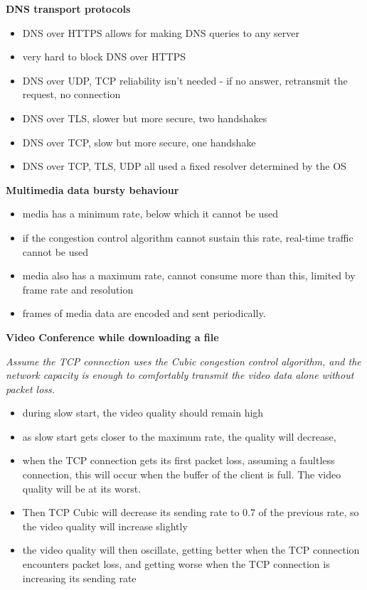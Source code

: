 \documentclass{article}
\begin{document}
\textbf{DNS transport protocols}
\begin{itemize}
    \item DNS over HTTPS allows for making DNS queries to any server
    \item very hard to block DNS over HTTPS
    \item DNS over UDP, TCP reliability isn't needed {-} if no answer, retransmit the request, no connection
    \item DNS over TLS, slower but more secure, two handshakes
    \item DNS over TCP, slow but more secure, one handshake
    \item DNS over TCP, TLS, UDP all used a fixed resolver determined by the OS
\end{itemize}


\textbf{Multimedia data bursty behaviour}
\begin{itemize}
    \item media has a minimum rate, below which it cannot be used
    \item if the congestion control algorithm cannot sustain this rate, real-time traffic cannot be used
    \item media also has a maximum rate, cannot consume more than this, limited by frame rate and resolution
    \item frames of media data are encoded and sent periodically.
\end{itemize}

\clearpage

\textbf{Video Conference while downloading a file}

\textit{Assume the TCP connection uses the Cubic congestion control algorithm, and the network capacity is enough to comfortably transmit the video data alone without packet loss.}
\begin{itemize}
    \item during slow start, the video quality should remain high
    \item as slow start gets closer to the maximum rate, the quality will decrease,
    \item when the TCP connection gets its first packet loss, assuming a faultless connection, this will occur when the buffer of the client is full. The video quality will be at its worst.
    \item Then TCP Cubic will decrease its sending rate to 0.7 of the previous rate, so the video
    quality will increase slightly
    \item the video quality will then oscillate, getting better when the TCP connection encounters packet loss, and getting worse when the TCP connection is increasing its sending rate
\end{itemize}
\end{document}
